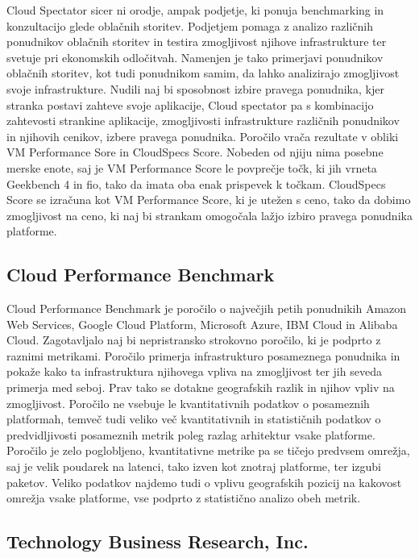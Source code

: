 Cloud Spectator sicer ni orodje, ampak podjetje, ki ponuja benchmarking in konzultacijo glede oblačnih storitev. Podjetjem pomaga z analizo različnih ponudnikov oblačnih storitev in testira zmogljivost njihove infrastrukture ter svetuje pri ekonomskih odločitvah. Namenjen je tako primerjavi ponudnikov oblačnih storitev, kot tudi ponudnikom samim, da lahko analizirajo zmogljivost svoje infrastrukture. Nudili naj bi sposobnost izbire pravega ponudnika, kjer stranka postavi zahteve svoje aplikacije, Cloud spectator pa s kombinacijo zahtevosti strankine aplikacije, zmogljivosti infrastrukture različnih ponudnikov in njihovih cenikov, izbere pravega ponudnika.
Poročilo vrača rezultate v obliki VM Performance Sore in CloudSpecs Score. Nobeden od njiju nima posebne merske enote, saj je VM Performance Score le povprečje točk, ki jih vrneta Geekbench 4 in fio, tako da imata oba enak prispevek k točkam. CloudSpecs Score se izračuna kot VM Performance Score, ki je utežen s ceno, tako da dobimo zmogljivost na ceno, ki naj bi strankam omogočala lažjo izbiro pravega ponudnika platforme.

\subsection{Cloud Performance Benchmark}

Cloud Performance Benchmark je poročilo o največjih petih ponudnikih Amazon Web Services, Google Cloud Platform, Microsoft Azure, IBM Cloud in Alibaba Cloud. Zagotavljalo naj bi nepristransko strokovno poročilo, ki je podprto z raznimi metrikami. Poročilo primerja infrastrukturo posameznega ponudnika in pokaže kako ta infrastruktura njihovega vpliva na zmogljivost ter jih seveda primerja med seboj. Prav tako se dotakne geografskih razlik in njihov vpliv na zmogljivost.
Poročilo ne vsebuje le kvantitativnih podatkov o posameznih platformah, temveč tudi veliko več kvantitativnih in statističnih podatkov o predvidljivosti posameznih metrik poleg razlag arhitektur vsake platforme. Poročilo je zelo poglobljeno, kvantitativne metrike pa se tičejo predvsem omrežja, saj je velik poudarek na latenci, tako izven kot znotraj platforme, ter izgubi paketov. Veliko podatkov najdemo tudi o vplivu geografskih pozicij na kakovost omrežja vsake platforme, vse podprto z statistično analizo obeh metrik.

\subsection{Technology Business Research, Inc.}

